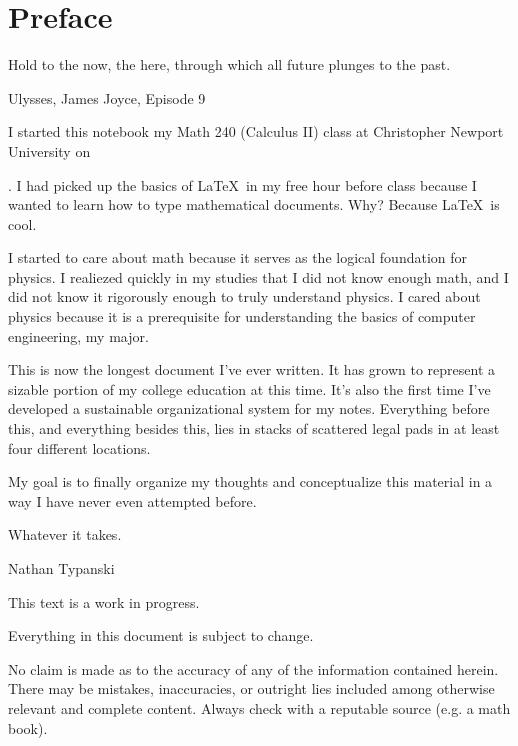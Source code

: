 
\chapter*{Preface}\epigraph{
  Hold to the now, the here, through which all future plunges to the
  past.
}
{Ulysses, James Joyce, Episode 9}

I started this notebook my Math 240 (Calculus II) class at Christopher Newport
University on \date{February 13, 2012}. I had picked up the basics of \LaTeX\ in my free hour
before class because I wanted to learn how to type mathematical documents. Why?
Because \LaTeX\ is cool.

I started to care about math because it serves as the logical foundation for
physics. I realiezed quickly in my studies that I did not know enough math, and I
did not know it rigorously enough to truly understand physics. I cared about
physics because it is a prerequisite for understanding the basics of computer
engineering, my major.


This is now the longest document I've ever written. It has grown to represent
a sizable portion of my college education at this time. It's also the first time I've
developed a sustainable organizational system for my notes. Everything before
this, and everything besides this, lies in stacks of scattered legal pads in at
least four different locations.

My goal is to finally organize my thoughts and conceptualize this material in a
way I have never even attempted before.

Whatever it takes.

\hfill{Nathan Typanski}

\hfill \date{April 9, 2012}

\newpage

This text is a work in progress.

Everything in this document is subject to change.

No claim is made as to the accuracy of any of the information contained herein. There may be mistakes, inaccuracies, or outright lies included among otherwise relevant and complete content. Always check with a reputable source (e.g. a math book).
